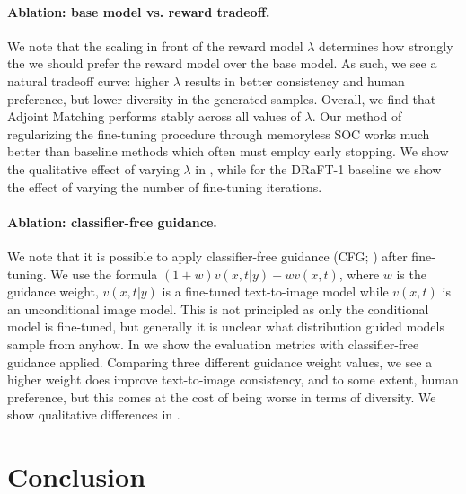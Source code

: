 \documentclass[]{fairmeta}
\begin{document}
\paragraph{Ablation: base model vs. reward tradeoff.} We note that the scaling in front of the reward model $\lambda$ determines how strongly the we should prefer the reward model over the base model. As such, we see a natural tradeoff curve: higher $\lambda$ results in better consistency and human preference, but lower diversity in the generated samples. Overall, we find that Adjoint Matching performs stably across all values of $\lambda$. Our method of regularizing the fine-tuning procedure through memoryless SOC works much better than baseline methods which often must employ early stopping. We show the qualitative effect of varying $\lambda$ in , while for the DRaFT-1 baseline we show the effect of varying the number of fine-tuning iterations.

\paragraph{Ablation: classifier-free guidance.} We note that it is possible to apply classifier-free guidance (CFG; \citet{ho2022classifier,zheng2023guided}) after fine-tuning. We use the formula $(1+w) v(x, t | y) - w v(x, t)$, where $w$ is the guidance weight, $v(x, t | y)$ is a fine-tuned text-to-image model while $v(x, t)$ is an unconditional image model.
This is not principled as only the conditional model is fine-tuned, but generally it is unclear what distribution guided models sample from anyhow. 
In  we show the evaluation metrics with classifier-free guidance applied. Comparing three different guidance weight values, we see a higher weight does improve text-to-image consistency, and to some extent, human preference, but this comes at the cost of being worse in terms of diversity. We show qualitative differences in .

\section{Conclusion}
\label{sec:conclusion}
\end{document}
